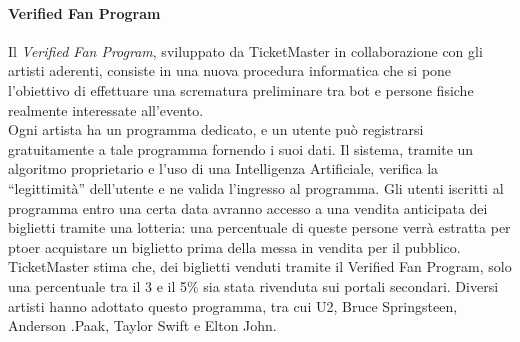 \paragraph{Verified Fan Program} 
Il \textit{Verified Fan Program}, sviluppato da TicketMaster in collaborazione con gli artisti aderenti, consiste in una nuova procedura informatica che si pone l'obiettivo di effettuare una scrematura preliminare tra bot e persone fisiche realmente interessate all'evento. \\Ogni artista ha un programma dedicato, e un utente può registrarsi gratuitamente a tale programma fornendo i suoi dati. Il sistema, tramite un algoritmo proprietario e l'uso di una Intelligenza Artificiale, verifica la "`legittimità"' dell'utente e ne valida l'ingresso al programma. Gli utenti iscritti al programma entro una certa data avranno accesso a una vendita anticipata dei biglietti tramite una lotteria: una percentuale di queste persone verrà estratta per ptoer acquistare un biglietto prima della messa in vendita per il pubblico. \\TicketMaster stima che, dei biglietti venduti tramite il Verified Fan Program, solo una percentuale tra il 3 e il 5\% sia stata rivenduta sui portali secondari. 
Diversi artisti hanno adottato questo programma, tra cui U2, Bruce Springsteen, Anderson .Paak, Taylor Swift e Elton John.

